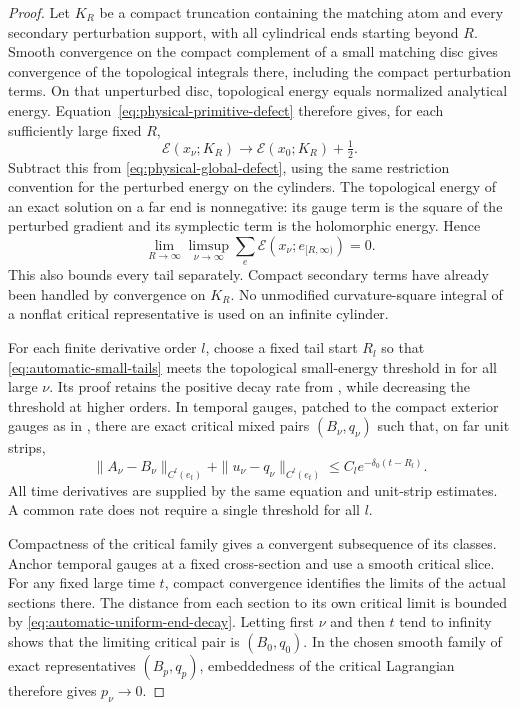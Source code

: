 \documentclass[11pt]{amsart}
\theoremstyle{definition}
\theoremstyle{remark}
\theoremstyle{plain}
\newcommand{\cE}{\mathcal{E}}
\begin{document}
\begin{proof}
Let $K_R$ be a compact truncation containing the matching
atom and every secondary perturbation support, with all
cylindrical ends starting beyond $R$. Smooth convergence
on the compact complement of a small matching disc gives
convergence of the topological integrals there, including
the compact perturbation terms. On that unperturbed disc,
topological energy equals normalized analytical energy.
Equation~\eqref{eq:physical-primitive-defect} therefore gives,
for each sufficiently large fixed $R$,
\[
           \cE(x_\nu;K_R)\longrightarrow\cE(x_0;K_R)+\tfrac12.
\]
Subtract this from \eqref{eq:physical-global-defect}, using
the same restriction convention for the perturbed energy
on the cylinders. The topological energy of an exact
solution on a far end is nonnegative: its gauge term is
the square of the perturbed gradient and its symplectic
term is the holomorphic energy. Hence
\begin{equation}\label{eq:automatic-small-tails}
 \lim_{R\to\infty}\limsup_{\nu\to\infty}
                \sum_e\cE(x_\nu;e_{[R,\infty)})=0.
\end{equation}
This also bounds every tail separately. Compact secondary
terms have already been handled by convergence on $K_R$.
No unmodified curvature-square integral of a nonflat
critical representative is used on an infinite cylinder.

For each finite derivative order $l$, choose a fixed
tail start $R_l$ so that \eqref{eq:automatic-small-tails}
meets the topological small-energy threshold in
\cite[Proposition~5.29]{DaeFukLip21a} for all large $\nu$.
Its proof retains the positive decay rate from
\cite[Proposition~5.24]{DaeFukLip21a}, while decreasing
the threshold at higher orders. In temporal gauges,
patched to the compact exterior gauges as in
\cite[Section~5.4]{DaeFukLip21a}, there are exact critical
mixed pairs $(B_\nu,q_\nu)$ such that, on far unit strips,
\begin{equation}\label{eq:automatic-uniform-end-decay}
 \|A_\nu-B_\nu\|_{C^l(e_t)}
            +\|u_\nu-q_\nu\|_{C^l(e_t)}
                 \leq C_l e^{-\delta_0(t-R_l)}.
\end{equation}
All time derivatives are supplied by the same equation
and unit-strip estimates. A common rate does not require
a single threshold for all $l$.

Compactness of the critical family gives a convergent
subsequence of its classes. Anchor temporal gauges at
a fixed cross-section and use a smooth critical slice.
For any fixed large time $t$, compact convergence
identifies the limits of the actual sections there.
The distance from each section to its own critical limit
is bounded by \eqref{eq:automatic-uniform-end-decay}.
Letting first $\nu$ and then $t$ tend to infinity shows
that the limiting critical pair is $(B_0,q_0)$.
In the chosen smooth family of exact representatives
$(B_p,q_p)$, embeddedness of the critical Lagrangian
therefore gives $p_\nu\to0$.


\end{proof}
\end{document}
